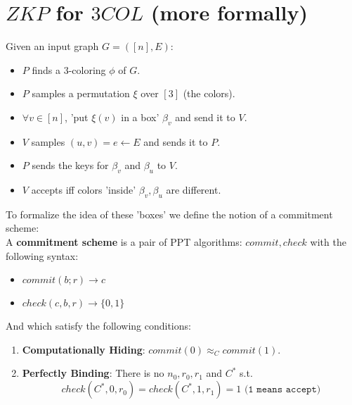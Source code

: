 \section*{$ZKP$ for $3COL$ (more formally)}
Given an input graph $G=([n],E)$:
\begin{itemize}
	\item $P$ finds a $3$-coloring $\phi$ of $G$.
	\item $P$ samples a permutation $\xi$ over $[3]$ (the colors).
	\item $\forall v\in[n]$, 'put $\xi(v)$ in a box' $\beta_v$ and send it to $V$.
	\item $V$ samples $(u,v)=e\leftarrow E$ and sends it to $P$.
	\item $P$ sends the keys for $\beta_v$ and $\beta_u$ to $V$.
	\item $V$ accepts iff colors 'inside' $\beta_v, \beta_u$ are different.
\end{itemize}
To formalize the idea of these 'boxes' we define the 
notion of a commitment scheme:\\
A \textbf{commitment scheme} is a pair of PPT algorithms: $commit, check$ with the following
syntax:
\begin{itemize}
	\item $commit(b;r)\rightarrow c$
	\item $check(c,b,r)\rightarrow \{0,1\}$
\end{itemize}
And which satisfy the following conditions:
\begin{enumerate}
	\item \textbf{Computationally Hiding}: $commit(0)\approx_C commit(1)$.
	\item \textbf{Perfectly Binding}: There is no $n_0,r_0,r_1$ and $C^*$ s.t.
	\[
		check(C^*,0,r_0)=check(C^*,1,r_1)=1\texttt{ (1 means accept)}	
	\]
\end{enumerate}